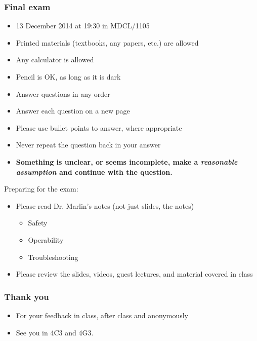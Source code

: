 \begin{frame}\frametitle{Final exam}
	\begin{itemize}
		\item	13 December 2014 at 19:30 in MDCL/1105
		\item	Printed materials (textbooks, any papers, etc.) are allowed
		\item	Any calculator is allowed
		\item	Pencil is OK, as long as it is dark
		\item	Answer questions in any order
		\item	Answer each question on a new page
		\item	Please use bullet points to answer, where appropriate
		\item	Never repeat the question back in your answer
		\item	\textbf{Something is unclear, or seems incomplete, make a \emph{reasonable assumption} and continue with the question.}
	\end{itemize}
	\vspace{12pt}
	Preparing for the exam:
	\begin{itemize}
		\item	Please read Dr. Marlin's notes (not just slides, the notes)
		\begin{itemize}
			\item	Safety
			\item	Operability
			\item	Troubleshooting
		\end{itemize}
		\item	Please review the slides, videos, guest lectures, and material covered in class
	\end{itemize}
\end{frame}

\begin{frame}\frametitle{Thank you}
	\begin{itemize}
		\item	For your feedback in class, after class and anonymously
		\item	{See you in 4C3 and 4G3.}
	\end{itemize}
\end{frame}

\begin{frame}\frametitle{}
	\begin{exampleblock}{}
		\begin{center}\huge {}
		\end{center}
	\end{exampleblock}
\end{frame}
